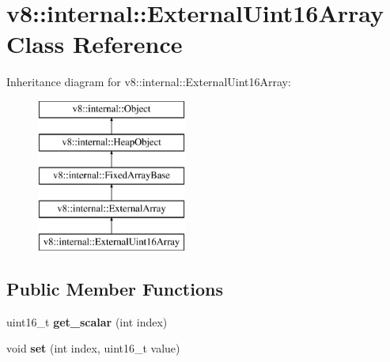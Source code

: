 \hypertarget{classv8_1_1internal_1_1_external_uint16_array}{}\section{v8\+:\+:internal\+:\+:External\+Uint16\+Array Class Reference}
\label{classv8_1_1internal_1_1_external_uint16_array}
Inheritance diagram for v8\+:\+:internal\+:\+:External\+Uint16\+Array\+:\begin{figure}[H]
\begin{center}
\leavevmode
\includegraphics[height=5.000000cm]{classv8_1_1internal_1_1_external_uint16_array}
\end{center}
\end{figure}
\subsection*{Public Member Functions}
\begin{DoxyCompactItemize}
\item 
\hypertarget{classv8_1_1internal_1_1_external_uint16_array_a454180370c8f6ee32c4d682b0c43ee2d}{}uint16\+\_\+t {\bfseries get\+\_\+scalar} (int index)\label{classv8_1_1internal_1_1_external_uint16_array_a454180370c8f6ee32c4d682b0c43ee2d}

\item 
\hypertarget{classv8_1_1internal_1_1_external_uint16_array_af5f12e15974198e8289c186c57019dd7}{}void {\bfseries set} (int index, uint16\+\_\+t value)\label{classv8_1_1internal_1_1_external_uint16_array_af5f12e15974198e8289c186c57019dd7}

\end{DoxyCompactItemize}
